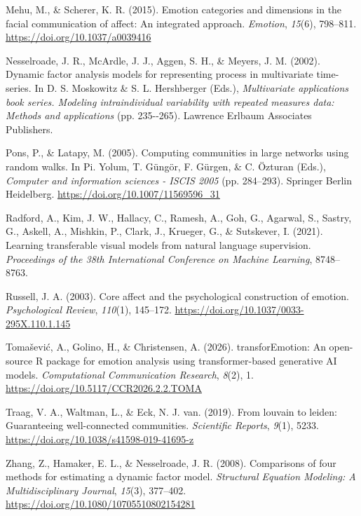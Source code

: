 \documentclass[
]{article}
\newlength{\cslhangindent}
\newenvironment{CSLReferences}[2] %
 {\begin{list}{}{%
  \setlength{\itemindent}{0pt}
  \setlength{\leftmargin}{0pt}
  \setlength{\parsep}{0pt}
  \ifodd #1
   \setlength{\leftmargin}{\cslhangindent}
   \setlength{\itemindent}{-1\cslhangindent}
  \fi
  \setlength{\itemsep}{#2\baselineskip}}}
 {\end{list}}
\begin{document}
\begin{CSLReferences}{1}{0}
Mehu, M., \& Scherer, K. R. (2015). Emotion categories and dimensions in
the facial communication of affect: {An} integrated approach.
\emph{Emotion}, \emph{15}(6), 798--811.
\url{https://doi.org/10.1037/a0039416}

Nesselroade, J. R., McArdle, J. J., Aggen, S. H., \& Meyers, J. M.
(2002). Dynamic factor analysis models for representing process in
multivariate time-series. In D. S. Moskowitz \& S. L. Hershberger
(Eds.), \emph{Multivariate applications book series. Modeling
intraindividual variability with repeated measures data: Methods and
applications} (pp. 235-\/-265). Lawrence Erlbaum Associates Publishers.

Pons, P., \& Latapy, M. (2005). Computing communities in large networks
using random walks. In Pi. Yolum, T. Güngör, F. Gürgen, \& C. Özturan
(Eds.), \emph{Computer and information sciences - ISCIS 2005} (pp.
284--293). Springer Berlin Heidelberg.
\url{https://doi.org/10.1007/11569596_31}

Radford, A., Kim, J. W., Hallacy, C., Ramesh, A., Goh, G., Agarwal, S.,
Sastry, G., Askell, A., Mishkin, P., Clark, J., Krueger, G., \&
Sutskever, I. (2021). Learning transferable visual models from natural
language supervision. \emph{Proceedings of the 38th International
Conference on Machine Learning}, 8748--8763.

Russell, J. A. (2003). Core affect and the psychological construction of
emotion. \emph{Psychological Review}, \emph{110}(1), 145--172.
\url{https://doi.org/10.1037/0033-295X.110.1.145}

Tomašević, A., Golino, H., \& Christensen, A. (2026). {transforEmotion}:
An open-source {R} package for emotion analysis using transformer-based
generative {AI} models. \emph{Computational Communication Research},
\emph{8}(2), 1. \url{https://doi.org/10.5117/CCR2026.2.2.TOMA}

Traag, V. A., Waltman, L., \& Eck, N. J. van. (2019). From louvain to
leiden: Guaranteeing well-connected communities. \emph{Scientific
Reports}, \emph{9}(1), 5233.
\url{https://doi.org/10.1038/s41598-019-41695-z}

Zhang, Z., Hamaker, E. L., \& Nesselroade, J. R. (2008). Comparisons of
four methods for estimating a dynamic factor model. \emph{Structural
Equation Modeling: A Multidisciplinary Journal}, \emph{15}(3), 377--402.
\url{https://doi.org/10.1080/10705510802154281}

\end{CSLReferences}
\end{document}
